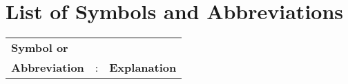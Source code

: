 \chapter*{List of Symbols and Abbreviations}

\begin{tabular}{lcl}
    \textbf{Symbol or}&&\\
    \textbf{Abbreviation} &:& \textbf{Explanation}\\
    
    
    
    
\end{tabular}

\clearpage